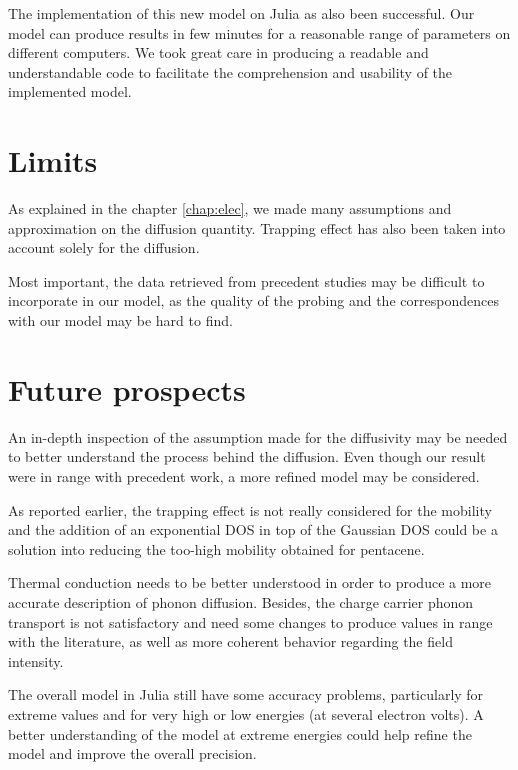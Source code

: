 The implementation of this new model on Julia as also been successful. Our model can produce results in few minutes for a reasonable range of parameters on different computers. We took great care in producing a readable and understandable code to facilitate the comprehension and usability of the implemented model.

\section{Limits}

As explained in the chapter \ref{chap:elec}, we made many assumptions and approximation on the diffusion quantity. Trapping effect has also been taken into account solely for the diffusion.

Most important, the data retrieved from precedent studies may be difficult to incorporate in our model, as the quality of the probing and the correspondences with our model may be hard to find.

\section{Future prospects}

An in-depth inspection of the assumption made for the diffusivity may be needed to better understand the process behind the diffusion. Even though our result were in range with precedent work, a more refined model may be considered.

As reported earlier, the trapping effect is not really considered for the mobility and the addition of an exponential DOS in top of the Gaussian DOS could be a solution into reducing the too-high mobility obtained for pentacene.

Thermal conduction needs to be better understood in order to produce a more accurate description of phonon diffusion. Besides, the charge carrier phonon transport is not satisfactory and need some changes to produce values in range with the literature, as well as more coherent behavior regarding the field intensity.

The overall model in Julia still have some accuracy problems, particularly for extreme values and for very high or low energies (at several electron volts). A better understanding of the model at extreme energies could help refine the model and improve the overall precision.